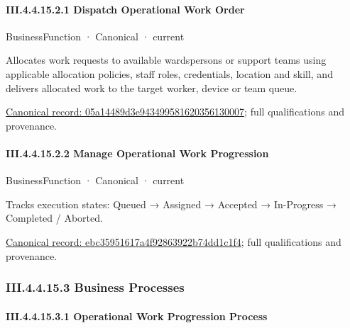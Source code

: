 \paragraph*{III.4.4.15.2.1 Dispatch Operational Work Order}
\label{navigation:III.4.4.15.2.1}

\label{element:05a14489d3e943499581620356130007}
{\small BusinessFunction · Canonical · current}\par

Allocates work requests to available wardspersons or support teams using applicable allocation policies, staff roles, credentials, location and skill, and delivers allocated work to the target worker, device or team queue.


{\footnotesize \href{../../../../continuum/business/business-function/05a14489d3e943499581620356130007.md}{Canonical record: 05a14489d3e943499581620356130007}; full qualifications and provenance.}\par
\paragraph*{III.4.4.15.2.2 Manage Operational Work Progression}
\label{navigation:III.4.4.15.2.2}

\label{element:ebc35951617a4f92863922b74dd1c1f4}
{\small BusinessFunction · Canonical · current}\par

Tracks execution states: Queued → Assigned → Accepted → In-Progress → Completed / Aborted.


{\footnotesize \href{../../../../continuum/business/business-function/ebc35951617a4f92863922b74dd1c1f4.md}{Canonical record: ebc35951617a4f92863922b74dd1c1f4}; full qualifications and provenance.}\par
\subsubsection*{III.4.4.15.3 Business Processes}
\label{navigation:III.4.4.15.3}

\paragraph*{III.4.4.15.3.1 Operational Work Progression Process}
\label{navigation:III.4.4.15.3.1}

